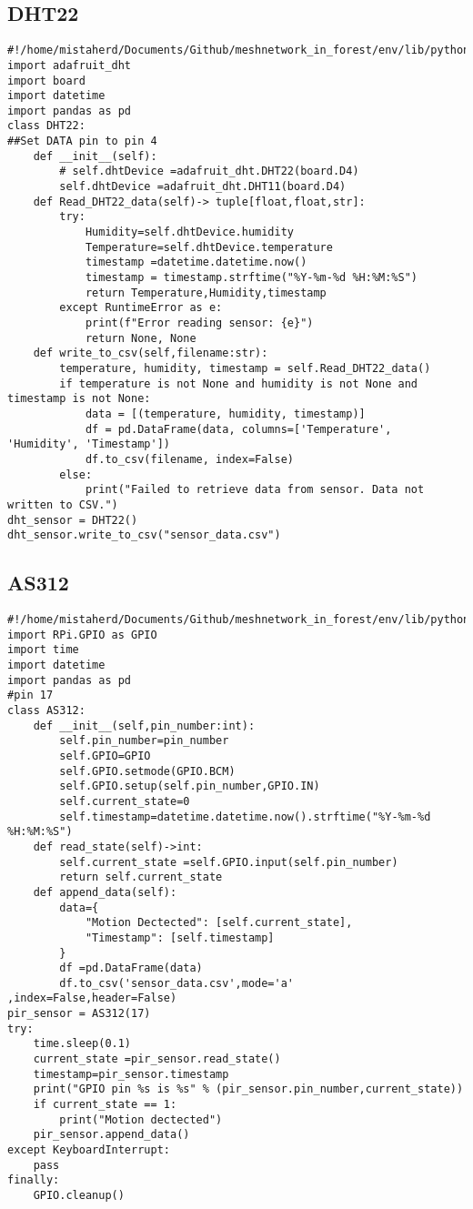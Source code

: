 \subsection{DHT22}
\begin{lstlisting}[style=mystyle,caption={DHT22code}]
#!/home/mistaherd/Documents/Github/meshnetwork_in_forest/env/lib/python3.11
import adafruit_dht 
import board
import datetime
import pandas as pd
class DHT22:
##Set DATA pin to pin 4
    def __init__(self):
        # self.dhtDevice =adafruit_dht.DHT22(board.D4)
        self.dhtDevice =adafruit_dht.DHT11(board.D4)
    def Read_DHT22_data(self)-> tuple[float,float,str]:
        try:
            Humidity=self.dhtDevice.humidity
            Temperature=self.dhtDevice.temperature
            timestamp =datetime.datetime.now()
            timestamp = timestamp.strftime("%Y-%m-%d %H:%M:%S")
            return Temperature,Humidity,timestamp
        except RuntimeError as e:
            print(f"Error reading sensor: {e}")
            return None, None
    def write_to_csv(self,filename:str):
        temperature, humidity, timestamp = self.Read_DHT22_data()
        if temperature is not None and humidity is not None and timestamp is not None:
            data = [(temperature, humidity, timestamp)]
            df = pd.DataFrame(data, columns=['Temperature', 'Humidity', 'Timestamp'])
            df.to_csv(filename, index=False)
        else:
            print("Failed to retrieve data from sensor. Data not written to CSV.")
dht_sensor = DHT22()
dht_sensor.write_to_csv("sensor_data.csv")
\end{lstlisting}
\newpage
\subsection{AS312}
\begin{lstlisting}[style=mystyle,caption={code for  AS312}]
#!/home/mistaherd/Documents/Github/meshnetwork_in_forest/env/lib/python3.11
import RPi.GPIO as GPIO
import time
import datetime
import pandas as pd
#pin 17
class AS312:
	def __init__(self,pin_number:int):
		self.pin_number=pin_number
		self.GPIO=GPIO
		self.GPIO.setmode(GPIO.BCM)
		self.GPIO.setup(self.pin_number,GPIO.IN)
		self.current_state=0
		self.timestamp=datetime.datetime.now().strftime("%Y-%m-%d %H:%M:%S")
	def read_state(self)->int:
		self.current_state =self.GPIO.input(self.pin_number)
		return self.current_state
	def append_data(self):
		data={
			"Motion Dectected": [self.current_state],
			"Timestamp": [self.timestamp]
		}
		df =pd.DataFrame(data)
		df.to_csv('sensor_data.csv',mode='a' ,index=False,header=False)
pir_sensor = AS312(17)
try:
	time.sleep(0.1)
	current_state =pir_sensor.read_state()
	timestamp=pir_sensor.timestamp
	print("GPIO pin %s is %s" % (pir_sensor.pin_number,current_state))
	if current_state == 1:
		print("Motion dectected")
	pir_sensor.append_data()
except KeyboardInterrupt:
	pass
finally:
	GPIO.cleanup()
\end{lstlisting}
\newpage
